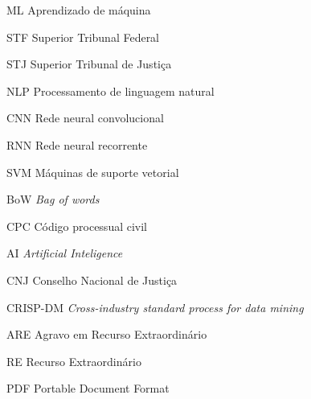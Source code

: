 \begin{siglas}
  \item[ML] Aprendizado de máquina
  \item[STF] Superior Tribunal Federal
  \item[STJ] Superior Tribunal de Justiça
  \item[NLP] Processamento de linguagem natural
  \item[CNN] Rede neural convolucional
  \item[RNN] Rede neural recorrente
  \item[SVM] Máquinas de suporte vetorial
  \item[BoW] \textit{Bag of words}
  \item[CPC] Código processual civil
  \item[AI] \textit{Artificial Inteligence}
  \item[CNJ] Conselho Nacional de Justiça
  \item[CRISP-DM] \textit{Cross-industry standard process for data mining}
  \item[ARE] Agravo em Recurso Extraordinário
  \item[RE] Recurso Extraordinário
  \item[PDF] Portable Document Format
\end{siglas}
